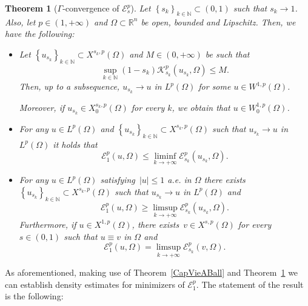 \documentclass[12pt]{article}
\newcommand{\R}{\mathbb{R}}
\newcommand{\N}{\mathbb{N}}
\numberwithin{equation}{section}
\newtheorem{thm}{Theorem}[section]
\renewcommand{\leq}{\leqslant}
\renewcommand{\geq}{\geqslant}
\begin{document}
\begin{thm}[$\Gamma$-convergence of $\mathcal{E}_s^p$]\label{12c-dgbnbc5543}
Let $\left\lbrace s_k\right\rbrace_{k\in\N}\subset (0,1)$ such that $s_k\to 1$. Also, let $p\in (1,+\infty)$ and $\Omega\subset\R^n$ be open, bounded and Lipschitz. Then, we have the following:

\begin{itemize}
\item[(i)] Let $\left\lbrace u_{s_k} \right\rbrace_{k\in\N} \subset X^{s_k,p}(\Omega)$ and $M\in (0,+\infty)$ be such that
\begin{equation}\label{kkkkfvetrre}
\sup_{k\in\N} (1-s_k)\mathcal{K}_{s_k}^p(u_{s_k},\Omega) \leq M.
\end{equation}
Then, up to a subsequence, $u_{s_k}\to u$ in $L^p(\Omega)$ for some $u\in  W^{1,p}(\Omega)$. 

Moreover, if $u_{s_k}\in X_0^{s_k,p}(\Omega)$ for every $k$, we obtain that $u\in W_0^{1,p}(\Omega)$. 
\item[(ii)] For any $u\in L^p(\Omega)$ and $\left\lbrace u_{s_k} \right\rbrace_{k\in\N} \subset X^{s_k,p}(\Omega)$ such that $u_{s_k}\to u$ in $L^p(\Omega)$ it holds that
\begin{equation}\label{utrc5342}
\mathcal{E}_1^p(u,\Omega)\leq \liminf_{k\to +\infty} \mathcal{E}_{s_k}^p(u_{s_k},\Omega).
\end{equation}
\item[(iii)] For any $u\in L^p(\Omega)$ satisfying~$\left|u\right|\leq 1$ a.e. in $\Omega$ there exists~$\left\lbrace u_{s_k}\right\rbrace_{k\in\N} \subset X^{s_k,p}(\Omega)$ such that $u_{s_k}\to u$ in $L^p(\Omega)$ and
\begin{equation*}
\mathcal{E}_1^p(u,\Omega)\geq \limsup_{k\to +\infty} \mathcal{E}_{s_k}^p(u_{s_k},\Omega). 
\end{equation*}
Furthermore, if $u\in X^{1,p}(\Omega)$, there exists~$v\in X^{s,p}(\Omega)$ for every $s\in(0,1)$ such that $u\equiv v$ in $\Omega$ and 
\begin{equation}\label{glordvendalat}
\mathcal{E}_1^p(u,\Omega)=\limsup_{k\to +\infty} \mathcal{E}_{s_k}^p(v,\Omega). 
\end{equation}
\end{itemize} 
\end{thm}

As aforementioned, making use of Theorem~\ref{CapVieABall} and Theorem~\ref{12c-dgbnbc5543} we can establish density estimates for minimizers of $\mathcal{E}_1^p$. The statement of the result is the following: 
\end{document}
